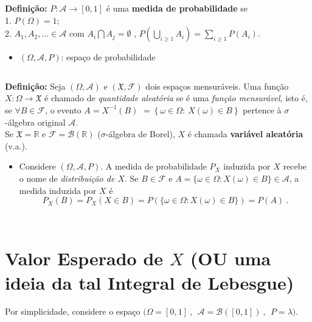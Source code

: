 \documentclass[
]{book}
\providecommand{\tightlist}{%
  \setlength{\itemsep}{0pt}\setlength{\parskip}{0pt}}
\begin{document}
\(~\)

\textbf{Definição:} \(P: \mathcal{A} \longrightarrow [0,1]\) é uma \textbf{medida de probabilidade} se\\
1. \(P(\Omega) = 1\);\\
2. \(\displaystyle A_1, A_2, \ldots \in \mathcal{A}\) com \(A_i \bigcap A_j = \emptyset\) , \(\displaystyle P\left(\bigcup_{i \geq 1} A_i\right) = \sum_{i \geq 1} P\left(A_i\right)\).

\begin{itemize}
\tightlist
\item
  \((\Omega, \mathcal{A}, P)\): espaço de probabilidade
\end{itemize}

\(~\)

\textbf{Definição:} Seja \((\Omega,\mathcal{A})\) e \((\mathfrak{X},\mathcal{F})\) dois espaços mensuráveis. Uma função \(X: \Omega \longrightarrow \mathfrak{X}\) é chamado de \emph{quantidade aleatória} se é uma \emph{função mensurável}, isto é, se \(\forall B \in \mathcal{F}\), o evento \(A = X^{-1}(B)\) \(= \left\{\omega \in \Omega:~X(\omega)\in B\right\}\) pertence à \(\sigma\)-álgebra original \(\mathcal{A}\).\\
Se \(\mathfrak{X} = \mathbb{R}\) e \(\mathcal{F}=\mathcal{B}(\mathbb{R})\) (\(\sigma\)-álgebra de Borel), \(X\) é chamada \textbf{variável aleatória} (v.a.).

\begin{itemize}
\tightlist
\item
  Considere \((\Omega,\mathcal{A},P)\). A medida de probabilidade \(P_X\) induzida por \(X\) recebe o nome de \emph{distribuição de \(X\)}. Se \(B \in \mathcal{F}\) e \(A = \{\omega \in \Omega : X(\omega) \in B\} \in \mathcal{A}\), a medida induzida por \(X\) é
  \[P_X(B) = P_X\left(X \in B\right) = P\left(\{\omega \in \Omega :  X(\omega) \in B\}\right) = P(A)~.\]
\end{itemize}

\(~\)

\(~\)

\hypertarget{lebesgue}{%
\section{\texorpdfstring{Valor Esperado de \(X\) (OU uma ideia da tal Integral de Lebesgue)}{Valor Esperado de X (OU uma ideia da tal Integral de Lebesgue)}}\label{lebesgue}}

Por simplicidade, considere o espaço \(\Big(\Omega = [0,1]~,~~ \mathcal{A} = \mathcal{B}\left([0,1]\right)~,~~ P=\lambda\Big)\).
\end{document}
